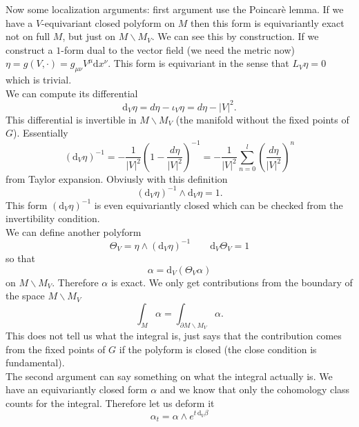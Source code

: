 \documentclass[11pt]{article}
\theoremstyle{definition}
\numberwithin{equation}{section}
\newcommand{\ddv}{\mathrm{d}_V}
\begin{document}
Now some localization arguments: first argument use the Poincarè lemma. If we have a $V$-equivariant closed polyform on $M$ then this form is equivariantly exact not on full $M$, but just on $M\backslash M_{V}$. We can see this by construction. If we construct a $1$-form dual to the vector field (we need the metric now) $ \eta = g(V,\cdot) = g_{\mu\nu}V^{\mu}\mathrm{d}x^{\nu}$. This form is equivariant in the sense that $L_{V}\eta=0$ which is trivial.\\
We can compute its differential
\begin{equation}
	\ddv\eta = d\eta-\iota_{V}\eta = d\eta-|V|^{2}.
\end{equation} 
This differential is invertible in $M\backslash M_{V}$ (the manifold without the fixed points of $G$). Essentially
\begin{equation}
	(\ddv\eta)^{-1} = -\frac{1}{|V|^{2}}\left(1-\frac{d\eta}{|V|^{2}}\right)^{-1} = -\frac{1}{|V|^{2}}\sum_{n=0}^{l}\left(\frac{d\eta}{|V|^{2}}\right)^{n}
\end{equation}
from Taylor expansion. Obviusly with this definition
\begin{equation}
	(\ddv\eta)^{-1}\wedge \ddv\eta = 1.
\end{equation}
This form $(\ddv\eta)^{-1}$ is even equivariantly closed which can be checked from the invertibility condition.\\
We can define another polyform
\begin{equation}
	\Theta_{V}=\eta\wedge(\ddv\eta)^{-1}\qquad \ddv\Theta_{V}=1
\end{equation}
so that
\begin{equation}
	\alpha = \ddv(\Theta_{V}\alpha)
\end{equation}
on $M\backslash M_{V}$. Therefore $\alpha$ is exact. We only get contributions from the boundary of the space $M\backslash M_{V}$
\begin{equation}
	\int_{M}\alpha = \int_{\partial M\backslash M_{V}}\alpha.
\end{equation}
This does not tell us what the integral is, just says that the contribution comes from the fixed points of $G$ if the polyform is closed (the close condition is fundamental).\\
The second argument can say something on what the integral actually is. We have an equivariantly closed form $\alpha$ and we know that only the cohomology class counts for the integral. Therefore let us deform it 
\begin{equation}
	\alpha_{t} = \alpha\wedge e^{t \,\ddv \beta}
\end{equation}
\end{document}
